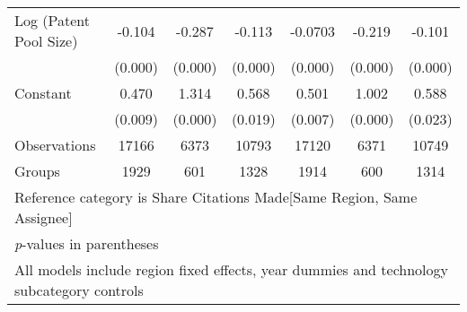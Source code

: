 \begin{sidewaystable}[htbp]
\begin{tabular}{l*{6}{c}}
Log (Patent Pool Size)&   -0.104&   -0.287&   -0.113&  -0.0703&   -0.219&   -0.101\\
                &  (0.000)&  (0.000)&  (0.000)&  (0.000)&  (0.000)&  (0.000)\\
Constant        &    0.470&    1.314&    0.568&    0.501&    1.002&    0.588\\
                &  (0.009)&  (0.000)&  (0.019)&  (0.007)&  (0.000)&  (0.023)\\
\hline
Observations    &    17166&     6373&    10793&    17120&     6371&    10749\\
Groups          &     1929&      601&     1328&     1914&      600&     1314\\
\hline\hline
\multicolumn{7}{l}{\footnotesize Reference category is Share Citations Made[Same Region, Same Assignee]}\\
\multicolumn{7}{l}{\footnotesize \textit{p}-values in parentheses}\\
\multicolumn{7}{l}{\footnotesize All models include region fixed effects, year dummies and technology subcategory controls}\\
\end{tabular}
\end{sidewaystable}
